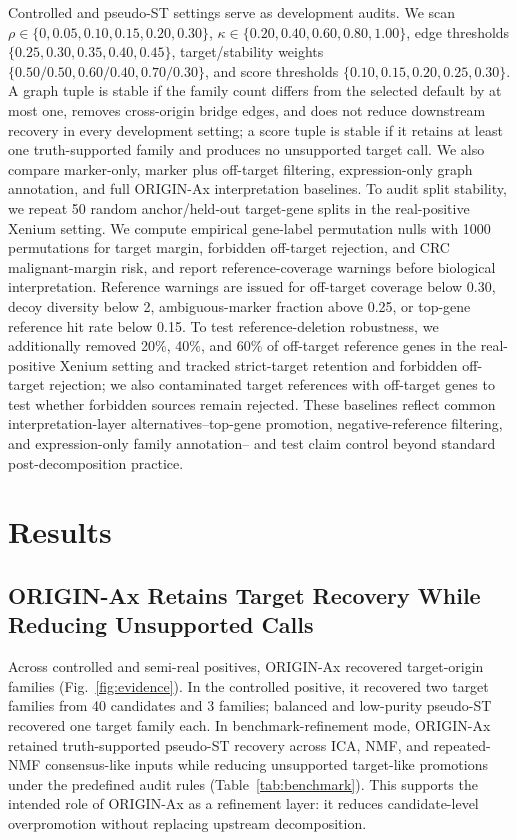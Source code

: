 \documentclass[conference]{IEEEtran}
\begin{document}
Controlled and pseudo-ST settings serve as development audits. We scan
$\rho\in\{0,0.05,0.10,0.15,0.20,0.30\}$,
$\kappa\in\{0.20,0.40,0.60,0.80,1.00\}$, edge thresholds
$\{0.25,0.30,0.35,0.40,0.45\}$, target/stability weights
$\{0.50/0.50,0.60/0.40,0.70/0.30\}$, and score thresholds
$\{0.10,0.15,0.20,0.25,0.30\}$. A graph tuple is stable if the family count differs
from the selected default by at most one, removes cross-origin bridge edges, and
does not reduce downstream recovery in every development setting; a score tuple
is stable if it retains at least one truth-supported family and produces no
unsupported target call. We also compare marker-only, marker plus off-target
filtering, expression-only graph annotation, and full ORIGIN-Ax interpretation
baselines. To audit split stability, we repeat 50 random anchor/held-out
target-gene splits in the real-positive Xenium setting. We compute empirical
gene-label permutation nulls with 1000 permutations for target margin,
forbidden off-target rejection, and CRC malignant-margin risk, and report
reference-coverage warnings before biological interpretation. Reference warnings
are issued for off-target coverage below 0.30, decoy diversity below 2,
ambiguous-marker fraction above 0.25, or top-gene reference hit rate below 0.15.
To test reference-deletion robustness, we additionally removed 20\%, 40\%, and
60\% of off-target reference genes in the real-positive Xenium setting and
tracked strict-target retention and forbidden off-target rejection; we also
contaminated target references with off-target genes to test whether forbidden
sources remain rejected.
These baselines reflect common interpretation-layer alternatives--top-gene
promotion, negative-reference filtering, and expression-only family annotation--
and test claim control beyond standard post-decomposition practice.

\section{Results}

\subsection{ORIGIN-Ax Retains Target Recovery While Reducing Unsupported Calls}

Across controlled and semi-real positives, ORIGIN-Ax recovered target-origin
families (Fig.~\ref{fig:evidence}). In the controlled positive, it recovered
two target families from 40 candidates and 3 families; balanced and low-purity
pseudo-ST recovered one target family each. In benchmark-refinement mode,
ORIGIN-Ax retained truth-supported pseudo-ST recovery across ICA, NMF, and
repeated-NMF consensus-like inputs while reducing unsupported target-like
promotions under the predefined audit rules (Table~\ref{tab:benchmark}). This
supports the intended role of ORIGIN-Ax as a refinement layer: it reduces
candidate-level overpromotion without replacing upstream decomposition.
\end{document}
